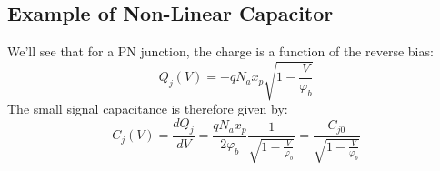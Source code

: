 \subsection{Example of Non-Linear Capacitor}
We’ll see that for a PN junction, the charge is a function of the reverse bias:
\begin{equation} 
	{Q_j}(V) =  - q{N_a}{x_p}\sqrt {1 - \frac{V}{{{\varphi _b}}}} 
\end{equation}
The small signal capacitance is therefore given by:
\begin{equation} 
	{C_j}(V) = \frac{{dQ_j^{}}}{{dV}} = \frac{{q{N_a}{x_p}}}{{2{\varphi _b}}}\frac{1}{{\sqrt {1 - \frac{V}{{{\varphi _b}}}} }} = \frac{{C_{j0}^{}}}{{\sqrt {1 - \frac{V}{{{\varphi _b}}}} }} 
\end{equation}
